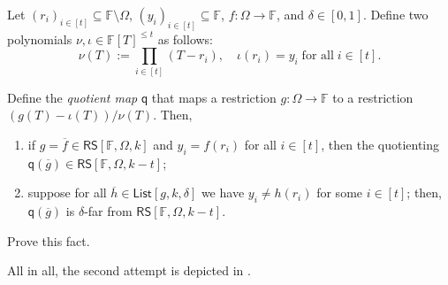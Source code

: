 \documentclass[../../book]{subfiles}
\begin{document}
\begin{proposition}\label{prop:multiple-quotientings}
  Let $(r_i)_{i \in [t]} \subseteq \mathbb{F} \setminus \Omega$, $(y_i)_{i \in [t]} \subseteq \mathbb{F}$, $f: \Omega \to \mathbb{F}$, and $\delta \in [0,1]$.
  Define two polynomials $\nu,\iota \in \mathbb{F}[T]^{\leq t}$ as follows:
  \begin{equation*}
    \nu(T) := \prod_{i \in [t]} (T-r_i), \quad \iota(r_i) = y_i \; \text{for all} \; i \in [t].
  \end{equation*}

  Define the \emph{quotient map} $\mathsf{q}$ that maps a restriction $g: \Omega \to \mathbb{F}$ to a restriction $(g(T)-\iota(T))/\nu(T)$. Then,
  \begin{enumerate}
    \item if $g = \overline{f} \in \mathsf{RS}[\mathbb{F}, \Omega, k]$ and $y_i=f(r_i)$ for all $i \in [t]$, then the quotienting $\mathsf{q}(\overline{g}) \in \mathsf{RS}[\mathbb{F},\Omega,k-t]$;
    \item suppose for all $\overline{h} \in \mathsf{List}[g,k,\delta]$ we have $y_i \neq h(r_i)$ for some $i \in [t]$; then, $\mathsf{q}(\overline{g})$ is $\delta$-far from $\mathsf{RS}[\mathbb{F},\Omega,k-t]$.
  \end{enumerate}
\end{proposition}

\begin{exercise}
  Prove this fact.
\end{exercise}

All in all, the second attempt is depicted in .
\end{document}
